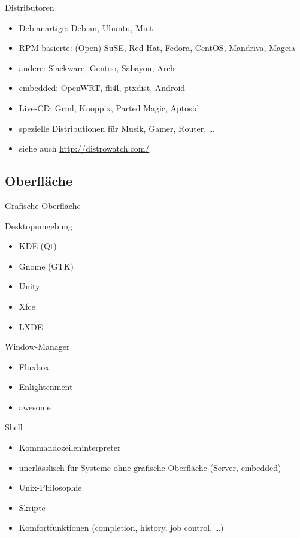 \documentclass{beamer}
\begin{document}
\begin{frame}{Distributoren}
    \begin{itemize}
        \item Debianartige: Debian, Ubuntu, Mint
        \pause
        \item RPM-basierte: (Open) SuSE, Red Hat, Fedora, CentOS,
            Mandriva, Mageia
        \pause
        \item andere: Slackware, Gentoo, Sabayon, Arch
        \pause
        \item embedded: OpenWRT, fli4l, ptxdist, Android
        \pause
        \item Live-CD: Grml, Knoppix, Parted Magic, Aptosid
        \pause
        \item spezielle Distributionen für Musik, Gamer, Router, …
        \item siehe auch \url{http://distrowatch.com/}
    \end{itemize}
\end{frame}

\subsection{Oberfläche}

\begin{frame}{Grafische Oberfläche}
    \begin{block}{Desktopumgebung}
        \begin{itemize}
            \item KDE (Qt)
            \item Gnome (GTK)
            \item Unity
            \item Xfce  
            \item LXDE
        \end{itemize}
    \end{block}
    \pause
    \begin{block}{Window-Manager}
        \begin{itemize}
            \item Fluxbox
            \item Enlightenment
            \item awesome
        \end{itemize}
    \end{block}
\end{frame}

\begin{frame}{Shell}
    \begin{itemize}
        \item Kommandozeileninterpreter
        \item unerlässlisch für Systeme ohne grafische Oberfläche 
            (Server, embedded)
        \item Unix-Philosophie
        \item Skripte
        \item Komfortfunktionen (completion, history, job control, …)
    \end{itemize}
\end{frame}
\end{document}
